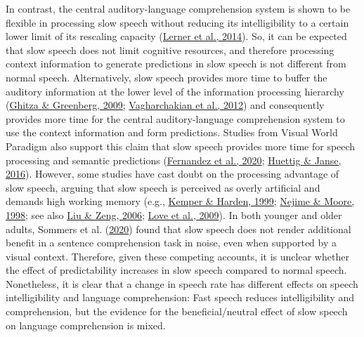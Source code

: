 \documentclass[a4paper, nobind]{templates/ociamthesis}
\begin{document}
In contrast, the central auditory-language comprehension system is shown to be flexible in processing slow speech without reducing its intelligibility to a certain lower limit of its rescaling capacity (\protect\hyperlink{ref-Lerner2014}{Lerner et al., 2014}).
So, it can be expected that slow speech does not limit cognitive resources, and therefore processing context information to generate predictions in slow speech is not different from normal speech.
Alternatively, slow speech provides more time to buffer the auditory information at the lower level of the information processing hierarchy (\protect\hyperlink{ref-Ghitza2009}{Ghitza \& Greenberg, 2009}; \protect\hyperlink{ref-Vagharchakian2012}{Vagharchakian et al., 2012}) and consequently provides more time for the central auditory-language comprehension system to use the context information and form predictions.
Studies from Visual World Paradigm also support this claim that slow speech provides more time for speech processing and semantic predictions (\protect\hyperlink{ref-Fernandez2020}{Fernandez et al., 2020}; \protect\hyperlink{ref-Huettig2016a}{Huettig \& Janse, 2016}).
However, some studies have cast doubt on the processing advantage of slow speech, arguing that slow speech is perceived as overly artificial and demands high working memory (e.g., \protect\hyperlink{ref-Kemper1999}{Kemper \& Harden, 1999}; \protect\hyperlink{ref-Nejime1998}{Nejime \& Moore, 1998}; see also \protect\hyperlink{ref-Liu2006}{Liu \& Zeng, 2006}; \protect\hyperlink{ref-Love2009}{Love et al., 2009}).
In both younger and older adults, Sommers et al. (\protect\hyperlink{ref-Sommers2020}{2020}) found that slow speech does not render additional benefit in a sentence comprehension task in noise, even when supported by a visual context.
Therefore, given these competing accounts, it is unclear whether the effect of predictability increases in slow speech compared to normal speech.
Nonetheless, it is clear that a change in speech rate has different effects on speech intelligibility and language comprehension: Fast speech reduces intelligibility and comprehension,
but the evidence for the beneficial/neutral effect of slow speech on language comprehension is mixed.
\end{document}
